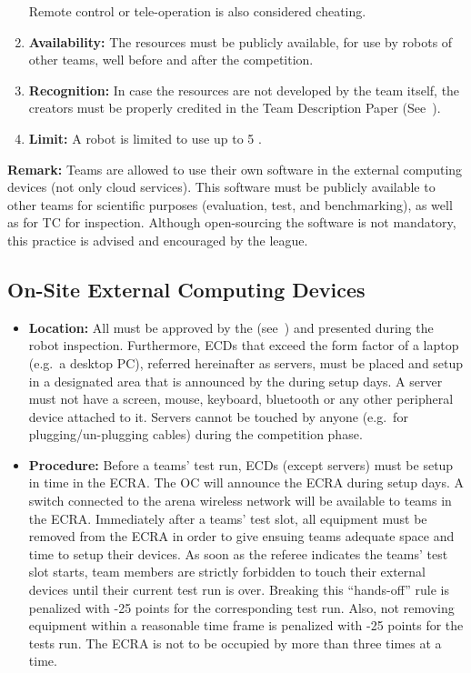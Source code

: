 \begin{enumerate}
	  Remote control or tele-operation is also considered cheating.
	\item \textbf{Availability:} The resources must be publicly available, for use by robots of other teams, well before and after the competition.
	\item \textbf{Recognition:} In case the resources are not developed by the team itself, the creators must be properly credited in the Team Description Paper (See~).
	\item \textbf{Limit:} A robot is limited to use up to 5 .
\end{enumerate}

\textbf{Remark:} Teams are allowed to use their own software in the external computing devices (not only cloud services). This software must be publicly available to other teams for scientific purposes (evaluation, test, and benchmarking), as well as for TC for inspection. Although open-sourcing the software is not mandatory, this practice is advised and encouraged by the league.

\subsection{On-Site External Computing Devices}
\label{rule:robot_external_computing_devices}

\begin{itemize}
  \item \textbf{Location:} All  must be approved by the 
  		(see~) and presented during the robot inspection. Furthermore, ECDs
  		that exceed the form factor of a laptop (e.g.~a desktop PC), referred hereinafter as servers, must be placed and
  		setup in a designated area that is announced by the  during setup days.
  		A server must not have a screen, mouse, keyboard, bluetooth or any other peripheral device attached to it.
  		Servers cannot be touched by anyone (e.g.~for plugging/un-plugging cables) during the competition phase.
  \item \textbf{Procedure:} Before a teams' test run, ECDs (except servers) must be setup in time in the
		 {ECRA}. The OC will announce the
        ECRA during setup days. A switch connected to the arena wireless network will be available to teams in the ECRA.
  		Immediately after a teams' test slot, all equipment must be removed from the ECRA in order to give ensuing
        teams adequate space and time to setup their devices. As soon as the referee indicates the teams' test slot
        starts, team members are strictly forbidden to touch their external devices until their current test run is over.
        Breaking this \enquote{hands-off} rule is penalized with -25 points for the corresponding test run. Also, not removing
        equipment within a reasonable time frame is penalized with -25 points for the tests run. The ECRA is not to be
		occupied by more than three times at a time.
\end{itemize}


